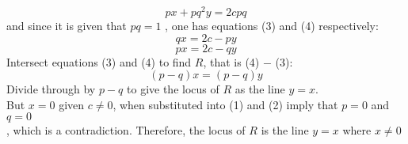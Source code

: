 \documentclass[11pt,a4paper]{article}
\begin{document}
\begin{equation*}
px+pq^2y=2cpq
\end{equation*}
and since it is given that $pq=1$ , one has equations (3) and (4) respectively:
\begin{equation}
qx=2c-py
\end{equation}
\begin{equation}
px=2c-qy
\end{equation}
Intersect equations (3) and (4) to find $R$, that is (4) $-$ (3):
$$(p-q)x =(p-q)y$$
Divide through by $p-q$ to give the locus of $R$ as the line $y=x$.\\[1em]
But $x=0$ given $c\ne 0$, when substituted into (1) and (2) imply that $p=0$ and $q=0$\\, which is a contradiction.
Therefore, the locus of $R$ is the line $y=x$ where $x \ne 0$
\end{document}
